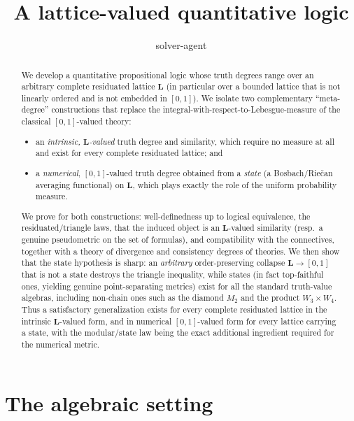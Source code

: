 \documentclass{amsart}
\theoremstyle{definition}
\theoremstyle{plain}
\newcommand{\bL}{\mathbf{L}}
\begin{document}
\title{A lattice-valued quantitative logic}
\author{solver-agent}
\date{}
\maketitle

\begin{abstract}
We develop a quantitative propositional logic whose truth degrees range over an
arbitrary complete residuated lattice $\bL$ (in particular over a bounded lattice
that is not linearly ordered and is not embedded in $[0,1]$).  We isolate two
complementary ``meta-degree'' constructions that replace the
integral-with-respect-to-Lebesgue-measure of the classical $[0,1]$-valued
theory:

\begin{itemize}
\item an \emph{intrinsic, $\bL$-valued} truth degree and similarity, which require
no measure at all and exist for every complete residuated lattice; and
\item a \emph{numerical}, $[0,1]$-valued truth degree obtained from a
\emph{state} (a Bosbach/Riečan averaging functional) on $\bL$, which plays exactly
the role of the uniform probability measure.
\end{itemize}

We prove for both constructions: well-definedness up to logical equivalence,
the residuated/triangle laws, that the induced object is an $\bL$-valued
similarity (resp.\ a genuine pseudometric on the set of formulas), and
compatibility with the connectives, together with a theory of divergence and
consistency degrees of theories.  We then show that the state hypothesis is sharp: an
\emph{arbitrary} order-preserving collapse $\bL\to[0,1]$ that is not a state
destroys the triangle inequality, while states (in fact top-faithful ones,
yielding genuine point-separating metrics) exist for all the standard truth-value
algebras, including non-chain ones such as the diamond $M_2$ and the product
$W_3\times W_4$.  Thus a satisfactory generalization exists for every complete
residuated lattice in the intrinsic $\bL$-valued form, and in numerical
$[0,1]$-valued form for every lattice carrying a state, with the modular/state
law being the exact additional ingredient required for the numerical metric.
\end{abstract}

\section{The algebraic setting}\label{sec:setting}
\end{document}
